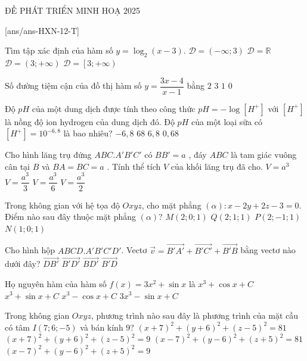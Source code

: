 \def\sode{12}
\def\tendethi{ĐỀ PHÁT TRIỂN MINH HOẠ 2025}
\begin{dethi}
 {\tendethi}
\end{dethi}
\caulc
{}[ans/ans-HXN-\sode-T]
\begin{ex}%
 Tìm tập xác định của hàm số $ y=\log_2\left(x-3\right)$.
 \choice
 {$\mathscr{D}=\left(-\infty;3\right)$}
 {$\mathscr{D}=\mathbb{R}$}
 {\True $\mathscr{D}=\left(3;+\infty\right)$}
 {$\mathscr{D}=\left[3;+\infty\right)$}
\end{ex}
\begin{ex}%
 Số đường tiệm cận của đồ thị hàm số $y=\dfrac{3x-4}{x-1}$ bằng
 \choice
 {\True $2$}
 {$3$}
 {$1$}
 {$0$}
\end{ex}
\begin{ex}%
 Độ $pH$ của một dung dịch được tính theo công thức $ pH=-\log\left[H^+\right]$ với $\left[H^+\right]$ là nồng độ ion hydrogen của dung dịch đó. Độ $ pH$ của một loại sữa có $\left[H^+\right]=10^{-6{,}8}$ là bao nhiêu?
 \choice
 {$-6{,}8$}
 {$68$}
 {\True $6{,}8$}
 {$0{,}68$}
\end{ex}
\begin{ex}%
 Cho hình lăng trụ đứng $ABC.A'B'C'$ có $BB'=a$ , đáy $ABC$ là tam giác vuông cân tại $ B$ và $BA=BC=a$ . Tính thể tích $ V$ của khối lăng trụ đã cho.
 \choice
 {$V=a^3$}
 {$V=\dfrac{a^3}{3}$}
 {$V=\dfrac{a^3}{6}$}
 {\True $V=\dfrac{a^3}{2}$}
\end{ex}
\begin{ex}%
 Trong không gian với hệ tọa độ $ Oxyz$, cho mặt phẳng $\left(\alpha\right)\colon x-2y+2z-3=0.$ Điểm nào sau đây thuộc mặt phẳng $\left(\alpha\right)$?
 \choice
 {$M\left(2;0;1\right)$}
 {$Q\left(2;1;1\right)$}
 {$P\left(2;-1;1\right)$}
 {\True $N\left(1;0;1\right)$}
\end{ex}
\begin{ex}%
 Cho hình hộp $ ABCD.A'B'C'D'$. Vectơ $\overrightarrow{v}=\overrightarrow{B'A'}+\overrightarrow{B'C'}+\overrightarrow{B'B}$ bằng vectơ nào dưới đây?
 \choice
 {$\overrightarrow{DB'}$}
{$\overrightarrow{B'D'}$}
{$\overrightarrow{BD'}$}
{\True $\overrightarrow{B'D}$}
\end{ex}
\begin{ex}%
Họ nguyên hàm của hàm số $ f(x)=3x^2+\sin x$ là 
\choice
{$x^3+\cos x+C$}
{$x^3+\sin x+C$}
{\True $x^3-\cos x+C$}
{$3x^3-\sin x+C$}
\end{ex}
\begin{ex}%
Trong không gian $ Oxyz$, phương trình nào sau đây là phương trình của mặt cầu có tâm $ I\left(7;6;-5\right)$ và bán kính $ 9$?
\choice
{$\left(x+7\right)^2+\left(y+6\right)^2+\left(z-5\right)^2=81$}
{$\left(x+7\right)^2+\left(y+6\right)^2+\left(z-5\right)^2=9$}
{\True $\left(x-7\right)^2+\left(y-6\right)^2+\left(z+5\right)^2=81$}
{$\left(x-7\right)^2+\left(y-6\right)^2+\left(z+5\right)^2=9$}
\end{ex}
